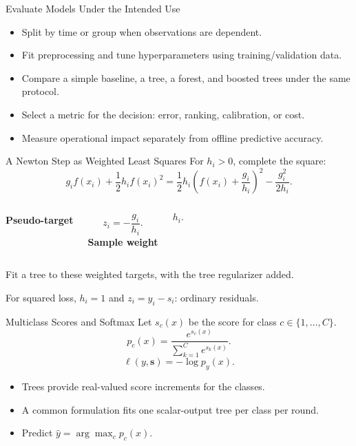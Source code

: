 
\begin{frame}{Evaluate Models Under the Intended Use}
  \begin{itemize}\setlength{\itemsep}{.4cm}
    \item Split by time or group when observations are dependent.
    \item Fit preprocessing and tune hyperparameters using training/validation data.
    \item Compare a simple baseline, a tree, a forest, and boosted trees under the same protocol.
    \item Select a metric for the decision: error, ranking, calibration, or cost.
    \item Measure operational impact separately from offline predictive accuracy.
  \end{itemize}
\end{frame}

\begin{frame}{A Newton Step as Weighted Least Squares}
  For $h_i>0$, complete the square:
  \[
    g_i f(x_i)+\frac12h_i f(x_i)^2
    =\frac12h_i\left(f(x_i)+\frac{g_i}{h_i}\right)^2
      -\frac{g_i^2}{2h_i}.
  \]
  \pause
  \vspace{.3cm}
  \begin{columns}[T,onlytextwidth]
    \textbf{Pseudo-target}\par
    \[z_i=-\frac{g_i}{h_i}.\]
    \textbf{Sample weight}\par
    \[h_i.\]
  \end{columns}
  \vspace{.25cm}
  Fit a tree to these weighted targets, with the tree regularizer added.\par
  \vspace{.2cm}
  For squared loss, $h_i=1$ and $z_i=y_i-s_i$: ordinary residuals.
\end{frame}

\begin{frame}{Multiclass Scores and Softmax}
  Let $s_c(x)$ be the score for class $c\in\{1,\ldots,C\}$.
  \[p_c(x)=\frac{e^{s_c(x)}}{\sum_{k=1}^{C}e^{s_k(x)}}.\]
  \[\ell(y,\boldsymbol s)=-\log p_y(x).\]
  \pause
  \vspace{.3cm}
  \begin{itemize}\spaceditems
    \item Trees provide real-valued score increments for the classes.
    \item A common formulation fits one scalar-output tree per class per round.
    \item Predict $\widehat y=\arg\max_c p_c(x)$.
  \end{itemize}
\end{frame}

